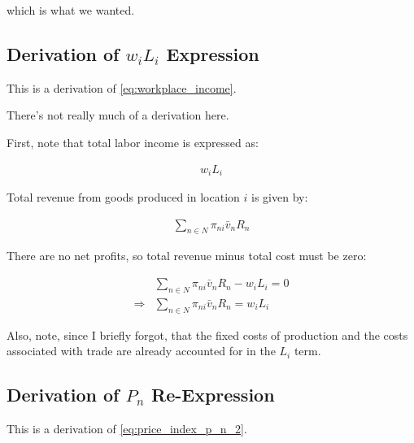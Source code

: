 \documentclass[10pt]{article}
\begin{document}
which is what we wanted.


\subsection{Derivation of $w_i L_i$ Expression}
\label{sec:workplace_income}

This is a derivation of \eqref{eq:workplace_income}.

There's not really much of a derivation here. 

First, note that total labor income is expressed as:

\begin{align}
    w_i L_i
\end{align}

Total revenue from goods produced in location $i$ is given by:

\begin{align}
    \sum_{n \in N} \pi_{n i} \bar{v}_n R_n
\end{align}

There are no net profits, so 
total revenue minus total cost must be zero:

\begin{align}
    &\sum_{n \in N} \pi_{n i} \bar{v}_n R_n - w_i L_i = 0 \\
    \Rightarrow &\sum_{n \in N} \pi_{n i} \bar{v}_n R_n = w_i L_i
\end{align}

Also, note, since I briefly forgot, that the fixed 
costs of production and the costs associated with 
trade are already accounted for in the $L_i$ term.


\subsection{Derivation of $P_n$ Re-Expression}
\label{sec:price_ni_2}

This is a derivation of \eqref{eq:price_index_p_n_2}.
\end{document}
